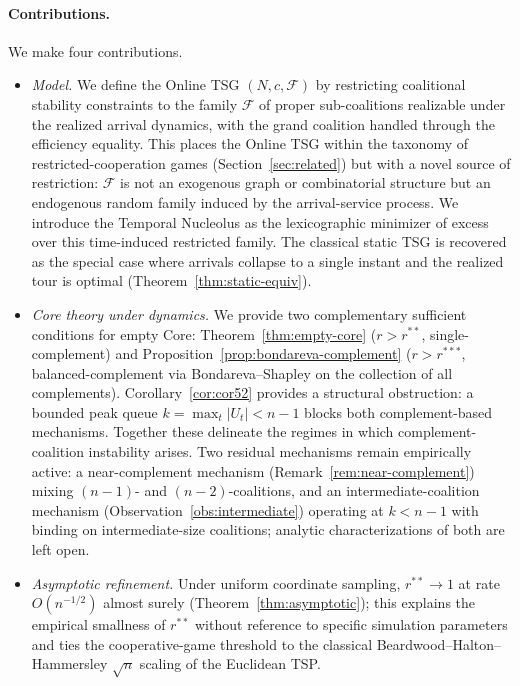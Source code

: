 \documentclass[11pt]{article}
\theoremstyle{plain}
\theoremstyle{definition}
\theoremstyle{remark}
\newcommand{\F}{\mathcal{F}}
\begin{document}
\paragraph{Contributions.} We make four contributions.
\begin{itemize}[leftmargin=1.5em]
\item[\textbf{C1.}] \emph{Model.} We define the Online TSG $(N, c, \F)$ by restricting coalitional stability constraints to the family $\F$ of proper sub-coalitions realizable under the realized arrival dynamics, with the grand coalition handled through the efficiency equality. This places the Online TSG within the taxonomy of restricted-cooperation games (Section~\ref{sec:related}) but with a novel source of restriction: $\F$ is not an exogenous graph or combinatorial structure but an endogenous random family induced by the arrival-service process. We introduce the Temporal Nucleolus as the lexicographic minimizer of excess over this time-induced restricted family. The classical static TSG is recovered as the special case where arrivals collapse to a single instant and the realized tour is optimal (Theorem~\ref{thm:static-equiv}).
\item[\textbf{C2.}] \emph{Core theory under dynamics.} We provide two complementary sufficient conditions for empty Core: Theorem~\ref{thm:empty-core} ($r>r^{\ast\ast}$, single-complement) and Proposition~\ref{prop:bondareva-complement} ($r>r^{\ast\ast\ast}$, balanced-complement via Bondareva--Shapley on the collection of all complements). Corollary~\ref{cor:cor52} provides a structural obstruction: a bounded peak queue $k=\max_t|U_t|<n-1$ blocks both complement-based mechanisms. Together these delineate the regimes in which complement-coalition instability arises. Two residual mechanisms remain empirically active: a near-complement mechanism (Remark~\ref{rem:near-complement}) mixing $(n-1)$- and $(n-2)$-coalitions, and an intermediate-coalition mechanism (Observation~\ref{obs:intermediate}) operating at $k<n-1$ with binding on intermediate-size coalitions; analytic characterizations of both are left open.
\item[\textbf{C3.}] \emph{Asymptotic refinement.} Under uniform coordinate sampling, $r^{\ast\ast}\to 1$ at rate $O(n^{-1/2})$ almost surely (Theorem~\ref{thm:asymptotic}); this explains the empirical smallness of $r^{\ast\ast}$ without reference to specific simulation parameters and ties the cooperative-game threshold to the classical Beardwood--Halton--Hammersley $\sqrt{n}$ scaling of the Euclidean TSP.

\end{itemize}
\end{document}
